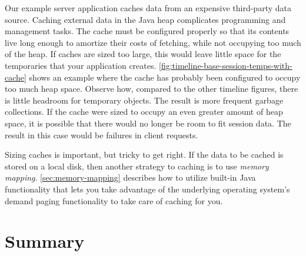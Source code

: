 Our example server application caches data from an expensive third-party data
source. Caching external data in the Java heap complicates programming and management tasks.
The cache must be configured properly so that its contents live long enough to 
amortize their costs of fetching, while not occupying too much of the heap. If
caches are sized too large, this would leave little space for the temporaries
that your application creates.
\autoref{fig:timeline-base-session-temps-with-cache} shows an example where the
cache has probably been configured to occupy too much heap space. Observe how,
compared to the other timeline figures, there is little headroom for temporary
objects. The result is more frequent garbage collections. If the cache were sized
to occupy an even greater amount of heap space, it is possible that there would
no longer be room to fit session data. The result in this case would be failures
in client requests.

Sizing caches is important, but tricky to get right. If the data to be cached is
stored on a local disk, then another strategy to caching is to use \emph{memory
mapping}. \autoref{sec:memory-mapping} describes how to utilize built-in Java
functionality that lets you take advantage of the underlying operating system's
demand paging functionality to take care of caching for you.


\section{Summary}

